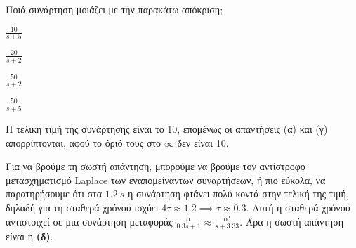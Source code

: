 \documentclass[11pt,a4paper,notitlepage,fleqn]{article}
\begin{document}
\begin{exercise}
Ποιά συνάρτηση μοιάζει με την παρακάτω απόκριση;


\begin{enumlatin}
    \item \( \displaystyle \frac{10}{s+5} \)
	\item \( \displaystyle \frac{20}{s+2} \)
	\item \( \displaystyle \frac{50}{s+2} \)
	\item \( \displaystyle \frac{50}{s+5} \)
\end{enumlatin}

\tcblower

Η τελική τιμή της συνάρτησης είναι το 10, επομένως οι απαντήσεις (α) και (γ) απορρίπτονται, αφού το όριό τους στο \( \infty \)
δεν είναι 10.

Για να βρούμε τη σωστή απάντηση, μπορούμε να βρούμε τον αντίστροφο μετασχηματισμό Laplace των εναπομείναντων συναρτήσεων, ή
πιο εύκολα, να παρατηρήσουμε ότι στα \( \SI{1.2}{s} \) η συνάρτηση φτάνει πολύ κοντά στην τελική της τιμή, δηλαδή
για τη σταθερά χρόνου ισχύει
\( 4τ \approx 1.2 \implies τ \approx 0.3 \). Αυτή η σταθερά χρόνου αντιστοιχεί σε μια συνάρτηση μεταφοράς \( \frac{α}{0.3s+1}
\approx \frac{α'}{s+3.33} \). Άρα η σωστή απάντηση είναι η \textbf{(δ)}.

\end{exercise}
\end{document}

